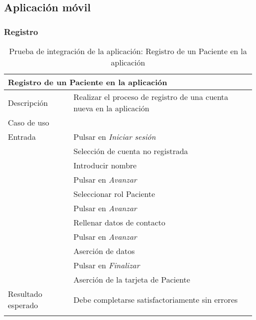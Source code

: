 \subsection{Aplicación móvil}

\subsubsection{Registro}

\begin{longtable}{|p{} p{}|}
    \hline
    \multicolumn{2}{|l|}{\textbf{Registro de un Paciente en la aplicación}} \\ \hline 
    Descripción                 & Realizar el proceso de registro de una cuenta nueva en la aplicación \\ \hline
    Caso de uso                 & \nameref{cu:registro} \\ \hline
    Entrada                     & Pulsar en \emph{Iniciar sesión} \\
                                & Selección de cuenta no registrada \\ 
                                & Introducir nombre \\
                                & Pulsar en \emph{Avanzar} \\
                                & Seleccionar rol Paciente \\
                                & Pulsar en \emph{Avanzar} \\
                                & Rellenar datos de contacto \\
                                & Pulsar en \emph{Avanzar} \\
                                & Aserción de datos \\
                                & Pulsar en \emph{Finalizar} \\
                                & Aserción de la tarjeta de Paciente \\ \hline
    Resultado esperado          & Debe completarse satisfactoriamente sin errores \\ \hline
    \caption{Prueba de integración de la aplicación: Registro de un Paciente en la aplicación}
    \label{cp:i:app:registro_paciente}
    
\end{longtable}

